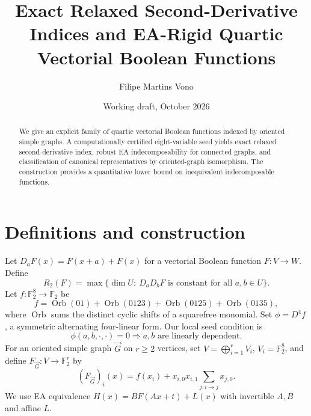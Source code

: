 \documentclass[11pt]{article}
\title{Exact Relaxed Second-Derivative Indices and EA-Rigid Quartic Vectorial Boolean Functions}
\author{Filipe Martins Vono}
\date{Working draft, October 2026}
\newcommand{\F}{\mathbb F}
\begin{document}
\maketitle
\begin{abstract}
We give an explicit family of quartic vectorial Boolean functions indexed by oriented simple graphs. A computationally certified eight-variable seed yields exact relaxed second-derivative index, robust EA indecomposability for connected graphs, and classification of canonical representatives by oriented-graph isomorphism. The construction provides a quantitative lower bound on inequivalent indecomposable functions.
\end{abstract}
\section{Definitions and construction}
Let $D_aF(x)=F(x+a)+F(x)$ for a vectorial Boolean function $F:V\to W$. Define
\[
R_2(F)=\max\{\dim U:\ D_aD_bF\text{ is constant for all }a,b\in U\}.
\]
Let $f:\F_2^8\to\F_2$ be
\[
f=\operatorname{Orb}(01)+\operatorname{Orb}(0123)+\operatorname{Orb}(0125)+\operatorname{Orb}(0135),
\]
where $\operatorname{Orb}$ sums the distinct cyclic shifts of a squarefree monomial. Set $\phi=D^4f$, a symmetric alternating four-linear form. Our local seed condition is
\begin{equation}\label{A}
\phi(a,b,\cdot,\cdot)=0\Longrightarrow a,b\text{ are linearly dependent}.
\end{equation}
For an oriented simple graph $\vec G$ on $r\ge2$ vertices, set $V=\bigoplus_{i=1}^rV_i$, $V_i=\F_2^8$, and define $F_{\vec G}:V\to\F_2^r$ by
\begin{equation}\label{construction}
(F_{\vec G})_i(x)=f(x_i)+x_{i,0}x_{i,1}\sum_{j:i\to j}x_{j,0}.
\end{equation}
We use EA equivalence $H(x)=B F(Ax+t)+L(x)$ with invertible $A,B$ and affine $L$.
\end{document}

